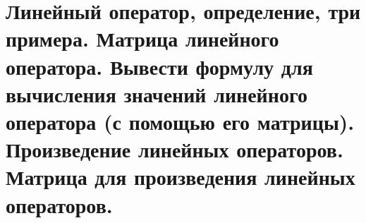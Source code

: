 \section{
    Линейный оператор, определение, три примера. Матрица линейного оператора. Вывести формулу для вычисления значений линейного оператора (с помощью его матрицы). Произведение линейных операторов. Матрица для произведения линейных операторов.
 }




\newpage





\newpage




\newpage



